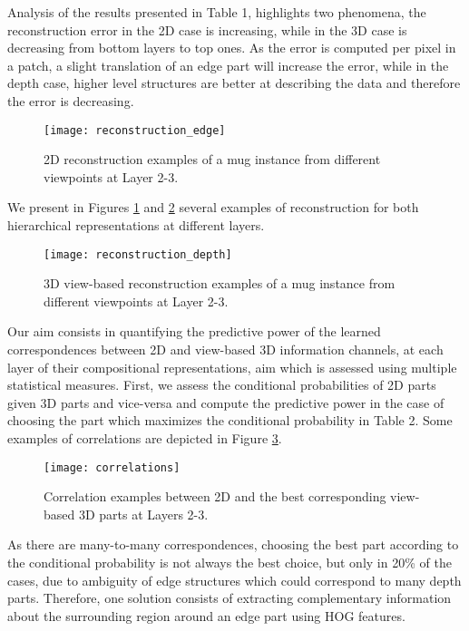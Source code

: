 \documentclass[runningheads]{llncs}
\begin{document}
Analysis of the results presented in Table 1, highlights two phenomena, the reconstruction error in the 2D case is increasing, while in the 3D case is decreasing from bottom layers to top ones. As the error is computed per pixel in a patch, a slight translation of an edge part will increase the error, while in the depth case, higher level structures are better at describing the data and therefore the error is decreasing. 

\begin{figure}
\begin{center}
\texttt{[image: reconstruction\_edge]}
\end{center}
\caption{2D reconstruction examples of a mug instance from different viewpoints at Layer 2-3.}
\label{reconstructionEdge}
\end{figure}

We present in Figures \ref{reconstructionEdge} and \ref{reconstructionDepth} several examples of reconstruction for both hierarchical representations at different layers. 

\begin{figure}
\begin{center}
\texttt{[image: reconstruction\_depth]}
\end{center}
\caption{3D view-based reconstruction examples of a mug instance from different viewpoints at Layer 2-3.}
\label{reconstructionDepth}
\end{figure}

Our aim consists in quantifying the predictive power of the learned correspondences between 2D and view-based 3D information channels, at each layer of their compositional representations, aim which is assessed using multiple statistical measures. First, we assess the conditional probabilities of 2D parts given 3D parts and vice-versa and compute the predictive power in the case of choosing the part which maximizes the conditional probability in Table 2. Some examples of correlations are depicted in Figure \ref{correlations}.

\begin{figure}
\begin{center}
\texttt{[image: correlations]}
\end{center}
\caption{Correlation examples between 2D and the best corresponding view-based 3D parts at Layers 2-3.}
\label{correlations}
\end{figure}

As there are many-to-many correspondences, choosing the best part according to the conditional probability is not always the best choice, but only in 20\% of the cases, due to ambiguity of edge structures which could correspond to many depth parts. Therefore, one solution consists of extracting complementary information about the surrounding region around an edge part using HOG features.
\end{document}
